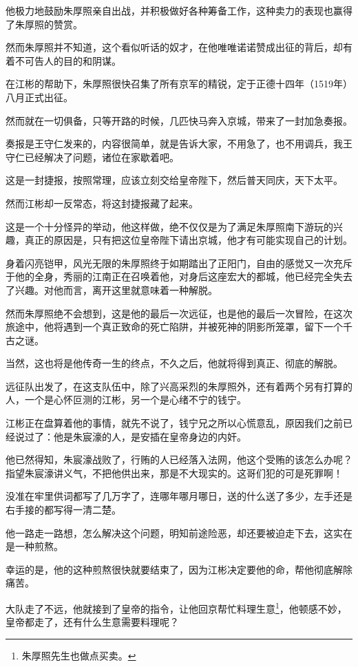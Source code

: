 \begin{multicols}{\theparacolNo}
		他极力地鼓励朱厚照亲自出战，并积极做好各种筹备工作，这种卖力的表现也赢得了朱厚照的赞赏。

		然而朱厚照并不知道，这个看似听话的奴才，在他唯唯诺诺赞成出征的背后，却有着不可告人的目的和阴谋。

		在江彬的帮助下，朱厚照很快召集了所有京军的精锐，定于正德十四年（1519年）八月正式出征。

		然而就在一切俱备，只等开路的时候，几匹快马奔入京城，带来了一封加急奏报。

		奏报是王守仁发来的，内容很简单，就是告诉大家，不用急了，也不用调兵，我王守仁已经解决了问题，诸位在家歇着吧。

		这是一封捷报，按照常理，应该立刻交给皇帝陛下，然后普天同庆，天下太平。

		然而江彬却一反常态，将这封捷报藏了起来。

		这是一个十分怪异的举动，他这样做，绝不仅仅是为了满足朱厚照南下游玩的兴趣，真正的原因是，只有把这位皇帝陛下请出京城，他才有可能实现自己的计划。

		身着闪亮铠甲，风光无限的朱厚照终于如期踏出了正阳门，自由的感觉又一次充斥于他的全身，秀丽的江南正在召唤着他，对身后这座宏大的都城，他已经完全失去了兴趣。对他而言，离开这里就意味着一种解脱。

		然而朱厚照绝不会想到，这是他的最后一次远征，也是他的最后一次冒险，在这次旅途中，他将遇到一个真正致命的死亡陷阱，并被死神的阴影所笼罩，留下一个千古之谜。

		当然，这也将是他传奇一生的终点，不久之后，他就将得到真正、彻底的解脱。

		远征队出发了，在这支队伍中，除了兴高采烈的朱厚照外，还有着两个另有打算的人，一个是心怀叵测的江彬，另一个是心绪不宁的钱宁。

		江彬正在盘算着他的事情，就先不说了，钱宁兄之所以心慌意乱，原因我们之前已经说过了：他是朱宸濠的人，是安插在皇帝身边的内奸。

		他已然得知，朱宸濠战败了，行贿的人已经落入法网，他这个受贿的该怎么办呢？指望朱宸濠讲义气，不把他供出来，那是不大现实的。这哥们犯的可是死罪啊！

		没准在牢里供词都写了几万字了，连哪年哪月哪日，送的什么送了多少，左手还是右手接的都写得一清二楚。

		他一路走一路想，怎么解决这个问题，明知前途险恶，却还要被迫走下去，这实在是一种煎熬。

		幸运的是，他的这种煎熬很快就要结束了，因为江彬决定要他的命，帮他彻底解除痛苦。

		大队走了不远，他就接到了皇帝的指令，让他回京帮忙料理生意\footnote{朱厚照先生也做点买卖。}，他顿感不妙，皇帝都走了，还有什么生意需要料理呢？


\end{multicols}
